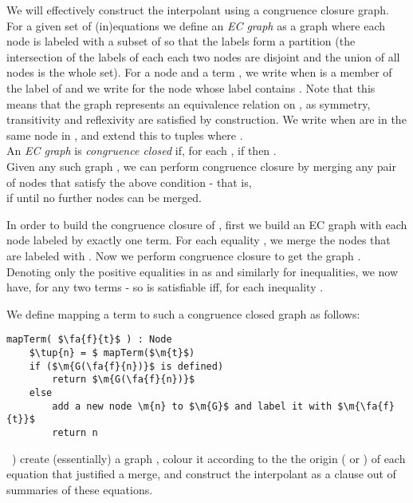 We will effectively construct the interpolant using a congruence closure graph.
For a given set of (in)equations  we define an 
\emph{EC graph}  as a graph where each node is labeled with a subset of  so that the labels form a partition (the intersection of the labels of each each two nodes are disjoint and the union of all nodes is the whole set).
For a node  and a term  , we write  when  is a member of the label of  and we write  for the node whose label contains .
Note that this means that the graph represents an equivalence relation on , as symmetry, transitivity and reflexivity are satisfied by construction.
We write  when  are in the same node in , and extend this to tuples where 
.\\
An \emph{EC graph}  is \emph{congruence closed} if, for each , 
if  then .\\
Given any such graph , we can perform congruence closure by merging any pair of nodes  that satisfy the above condition - that is, \\
if  until no further nodes can be merged.

In order to build the congruence closure of , first we build an EC graph with each node labeled by exactly one term.
For each equality , we merge the nodes that are labeled with .
Now we perform congruence closure to get the graph .
Denoting only the positive equalities in  as  and similarly  for inequalities, we now have, for any two terms  
 - so  is satisfiable iff, for each inequality  
.

We define mapping a term  to such a congruence closed graph  as follows:
\begin{lstlisting}
mapTerm( $\fa{f}{t}$ ) : Node
	$\tup{n} = $ mapTerm($\m{t}$)
	if ($\m{G(\fa{f}{n})}$ is defined)
		return $\m{G(\fa{f}{n})}$
	else
		add a new node \m{n} to $\m{G}$ and label it with $\m{\fa{f}{t}}$
		return n
\end{lstlisting}

~\cite{FuchsGoelGrundyKrsticTinelli2012}) create (essentially) a graph , colour it according to the the origin ( or ) of each equation that justified a merge, and construct the interpolant as a clause out of summaries of these equations.


